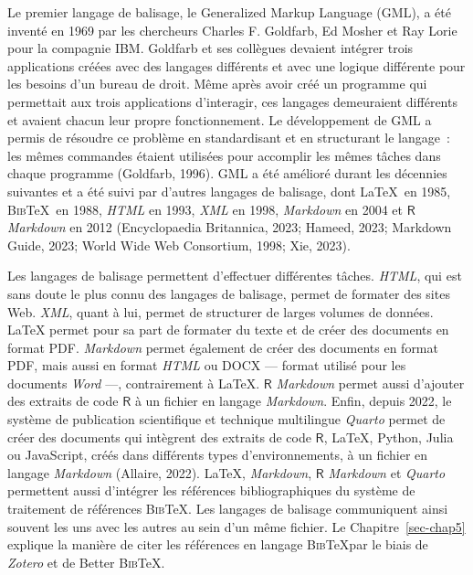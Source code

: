 \documentclass[
  letterpaper,
  DIV=11,
  numbers=noendperiod,
  oneside]{scrreprt}
\begin{document}
Le premier langage de balisage, le Generalized Markup Language (GML), a
été inventé en 1969 par les chercheurs Charles F. Goldfarb, Ed Mosher et
Ray Lorie pour la compagnie IBM. Goldfarb et ses collègues devaient
intégrer trois applications créées avec des langages différents et avec
une logique différente pour les besoins d'un bureau de droit. Même après
avoir créé un programme qui permettait aux trois applications
d'interagir, ces langages demeuraient différents et avaient chacun leur
propre fonctionnement. Le développement de GML a permis de résoudre ce
problème en standardisant et en structurant le langage~: les mêmes
commandes étaient utilisées pour accomplir les mêmes tâches dans chaque
programme (Goldfarb, 1996). GML a été amélioré durant les décennies
suivantes et a été suivi par d'autres langages de balisage, dont
\LaTeX{}~en 1985, \textsc{Bib}\TeX~en 1988, \emph{HTML} en 1993,
\emph{XML} en 1998, \emph{Markdown} en 2004 et \(\textsf{R}\)
\emph{Markdown} en 2012 (Encyclopaedia Britannica, 2023; Hameed, 2023;
Markdown Guide, 2023; World Wide Web Consortium, 1998; Xie, 2023).

Les langages de balisage permettent d'effectuer différentes tâches.
\emph{HTML}, qui est sans doute le plus connu des langages de balisage,
permet de formater des sites Web. \emph{XML}, quant à lui, permet de
structurer de larges volumes de données. \LaTeX{} permet pour sa part de
formater du texte et de créer des documents en format PDF.
\emph{Markdown} permet également de créer des documents en format PDF,
mais aussi en format \emph{HTML} ou DOCX --- format utilisé pour les
documents \emph{Word} ---, contrairement à \LaTeX{}. \(\textsf{R}\)
\emph{Markdown} permet aussi d'ajouter des extraits de code
\(\textsf{R}\) à un fichier en langage \emph{Markdown}. Enfin, depuis
2022, le système de publication scientifique et technique multilingue
\emph{Quarto} permet de créer des documents qui intègrent des extraits
de code \(\textsf{R}\), \LaTeX{}, Python, Julia ou JavaScript, créés
dans différents types d'environnements, à un fichier en langage
\emph{Markdown} (Allaire, 2022). \LaTeX{}, \emph{Markdown},
\(\textsf{R}\) \emph{Markdown} et \emph{Quarto} permettent aussi
d'intégrer les références bibliographiques du système de traitement de
références \textsc{Bib}\TeX. Les langages de balisage communiquent ainsi
souvent les uns avec les autres au sein d'un même fichier. Le
Chapitre~\ref{sec-chap5} explique la manière de citer les références en
langage \textsc{Bib}\TeX par le biais de \emph{Zotero} et de Better
\textsc{Bib}\TeX.
\end{document}
